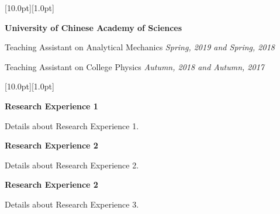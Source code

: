 \documentclass[12pt,a4paper,utf8]{report}
\begin{document}
\begin{minipage}[t]{16cm}
    \colorbox{subtitlecolor}{\raisebox{0pt}[10.0pt][1.0pt]{
        \textcolor{white}{\textsf{}}}}
\end{minipage}\par
\vspace{0.2cm}\hspace{0.5cm}
\begin{minipage}[t]{15cm}
    {{\textbf{University of Chinese Academy of Sciences}}}\par
    \quad Teaching Assistant on Analytical Mechanics\hfill
    {\em{Spring, 2019 and Spring, 2018}}\par
    \quad Teaching Assistant on College Physics\hfill
    {\em{Autumn, 2018 and Autumn, 2017}}\par
\end{minipage}\par
\vspace{0.4cm}

\newpage
\begin{minipage}[t]{16cm}
    \colorbox{subtitlecolor}{\raisebox{0pt}[10.0pt][1.0pt]{
        \textcolor{white}{\textsf{}}}}
\end{minipage}\par
\vspace{0.2cm}\hspace{0.5cm}
\begin{minipage}[t]{15cm}
    {\textbf{Research Experience 1}}\par
    \qquad\qquad\qquad\qquad\qquad{}\par
    \quad Details about Research Experience 1. \par
    \vspace{0.2cm}
    {\textbf{Research Experience 2}}\par
    \qquad\qquad\qquad\qquad\qquad{}\par
    \quad Details about Research Experience 2. \par
    \vspace{0.2cm}
    {\textbf{Research Experience 2}}\par
    \qquad\qquad\qquad\qquad\qquad{}\par
    \quad Details about Research Experience 3. \par
\end{minipage}\par
\vspace{0.4cm}
\end{document}
